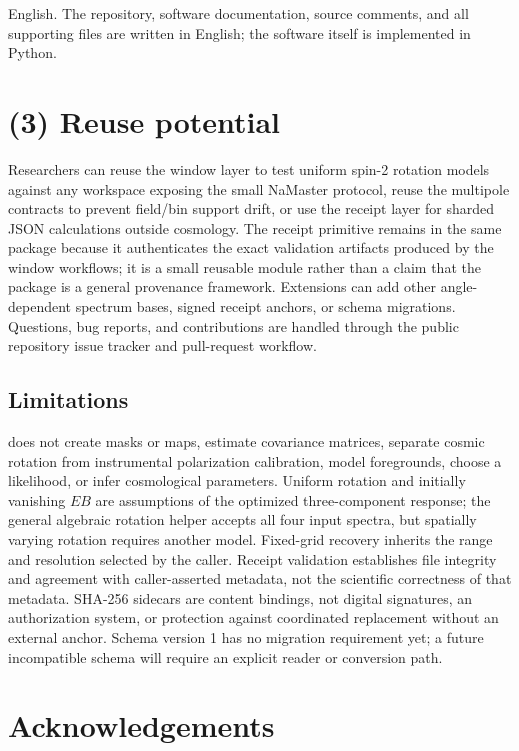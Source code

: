English. The repository, software documentation, source comments, and all
supporting files are written in English; the software itself is implemented in
Python.

\section*{(3) Reuse potential}

Researchers can reuse the window layer to test uniform spin-2 rotation models
against any workspace exposing the small NaMaster protocol, reuse the multipole
contracts to prevent field/bin support drift, or use the receipt layer for
sharded JSON calculations outside cosmology. The receipt primitive remains in
the same package because it authenticates the exact validation artifacts
produced by the window workflows; it is a small reusable module rather than a
claim that the package is a general provenance framework. Extensions can add other
angle-dependent spectrum bases, signed receipt anchors, or schema migrations.
Questions, bug reports, and contributions are handled through the public
repository issue tracker and pull-request workflow.

\subsection*{Limitations}

\software{} does not create masks or maps, estimate covariance matrices,
separate cosmic rotation from instrumental polarization calibration, model
foregrounds, choose a likelihood, or infer cosmological parameters.  Uniform
rotation and initially vanishing \(EB\) are assumptions of the optimized
three-component response; the general algebraic rotation helper accepts all
four input spectra, but spatially varying rotation requires another model.
Fixed-grid recovery inherits the range and resolution selected by the caller.
Receipt validation establishes file integrity and agreement with caller-asserted
metadata, not the scientific correctness of that metadata. SHA-256 sidecars
are content bindings, not digital signatures, an authorization system, or
protection against coordinated replacement without an external anchor.
Schema version 1 has no migration requirement yet; a future incompatible
schema will require an explicit reader or conversion path.

\section*{Acknowledgements}


